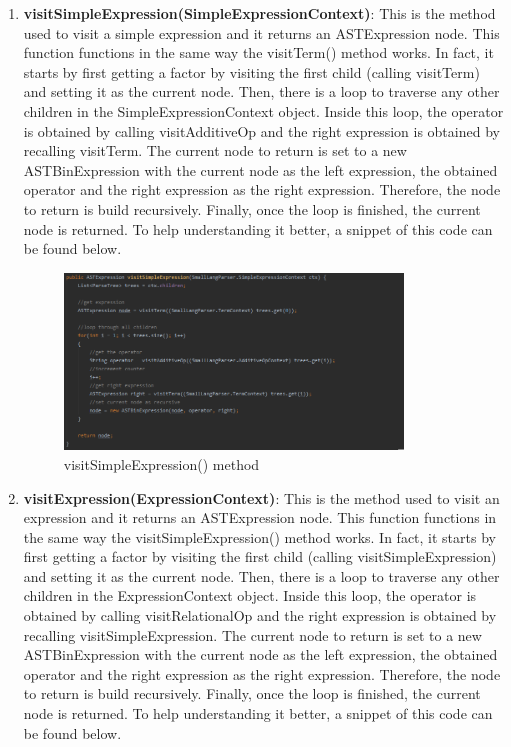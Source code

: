 \documentclass{article}
\begin{document}
\begin{enumerate}
					\item \textbf{visitSimpleExpression(SimpleExpressionContext)}:  This is the method used to visit a simple expression and it returns an ASTExpression node. This function functions in the same way the visitTerm() method works. In fact, it starts by first getting a factor by visiting the first child (calling visitTerm) and setting it as the current node. Then, there is a loop to traverse any other children in the SimpleExpressionContext object. Inside this loop, the operator is obtained by calling visitAdditiveOp and the right expression is obtained by recalling visitTerm. The current node to return is set to a new ASTBinExpression with the current node as the left expression, the obtained operator and the right expression as the right expression. Therefore, the node to return is build recursively. Finally, once the loop is finished, the current node is returned. To help understanding it better, a snippet of this code can be found below.
					
										\begin{figure}[H]
					\centering
			 			\includegraphics[width=0.85\textwidth]{transformerse.png}
			  			\caption{visitSimpleExpression() method}
			  			\label{fig:transformerse}
					\end{figure}
					
					\item \textbf{visitExpression(ExpressionContext)}:  This is the method used to visit an expression and it returns an ASTExpression node. This function functions in the same way the visitSimpleExpression() method works. In fact, it starts by first getting a factor by visiting the first child (calling visitSimpleExpression) and setting it as the current node. Then, there is a loop to traverse any other children in the ExpressionContext object. Inside this loop, the operator is obtained by calling visitRelationalOp and the right expression is obtained by recalling visitSimpleExpression. The current node to return is set to a new ASTBinExpression with the current node as the left expression, the obtained operator and the right expression as the right expression. Therefore, the node to return is build recursively. Finally, once the loop is finished, the current node is returned. To help understanding it better, a snippet of this code can be found below.
					

\end{enumerate}
\end{document}
